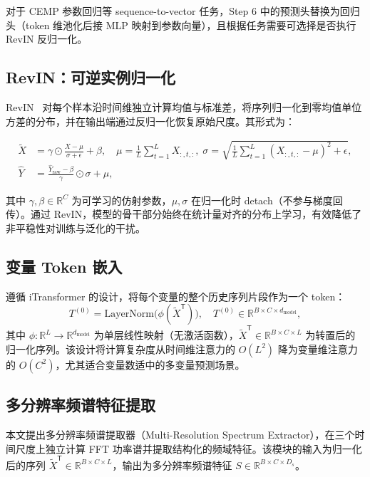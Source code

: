 对于 CEMP 参数回归等 sequence-to-vector 任务，Step 6 中的预测头替换为回归头（token 维池化后接 MLP 映射到参数向量），且根据任务需要可选择是否执行 RevIN 反归一化。

\subsection{RevIN：可逆实例归一化}
\label{subsec:revin}

RevIN~\cite{revin} 对每个样本沿时间维独立计算均值与标准差，将序列归一化到零均值单位方差的分布，并在输出端通过反归一化恢复原始尺度。其形式为：

\begin{align}
  \tilde{X} &= \gamma \odot \frac{X - \mu}{\sigma + \epsilon} + \beta, \quad
  \mu = \frac{1}{L}\sum_{t=1}^{L} X_{:,t,:},\;
  \sigma = \sqrt{\frac{1}{L}\sum_{t=1}^{L} (X_{:,t,:} - \mu)^2 + \epsilon}, \\
  \hat{Y} &= \frac{\hat{Y}_{\text{raw}} - \beta}{\gamma} \odot \sigma + \mu,
\end{align}

其中 \(\gamma, \beta \in \mathbb{R}^{C}\) 为可学习的仿射参数，\(\mu, \sigma\) 在归一化时 detach（不参与梯度回传）。通过 RevIN，模型的骨干部分始终在统计量对齐的分布上学习，有效降低了非平稳性对训练与泛化的干扰。

\subsection{变量 Token 嵌入}
\label{subsec:token_embed}

遵循 iTransformer 的设计，将每个变量的整个历史序列片段作为一个 token：
\begin{equation}
  T^{(0)} = \mathrm{LayerNorm}\big(\phi(\tilde{X}^{\mathsf{T}})\big),
  \quad T^{(0)} \in \mathbb{R}^{B \times C \times d_{\text{model}}},
\end{equation}
其中 \(\phi: \mathbb{R}^{L} \to \mathbb{R}^{d_{\text{model}}}\) 为单层线性映射（无激活函数），\(\tilde{X}^{\mathsf{T}} \in \mathbb{R}^{B \times C \times L}\) 为转置后的归一化序列。该设计将计算复杂度从时间维注意力的 \(O(L^2)\) 降为变量维注意力的 \(O(C^2)\)，尤其适合变量数适中的多变量预测场景。

\subsection{多分辨率频谱特征提取}
\label{subsec:multires_spectrum}

本文提出多分辨率频谱提取器（Multi-Resolution Spectrum Extractor），在三个时间尺度上独立计算 FFT 功率谱并提取结构化的频域特征。该模块的输入为归一化后的序列 \(\tilde{X}^{\mathsf{T}} \in \mathbb{R}^{B \times C \times L}\)，输出为多分辨率频谱特征 \(S \in \mathbb{R}^{B \times C \times D_s}\)。

